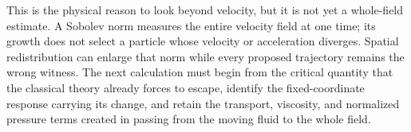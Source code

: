 This is the physical reason to look beyond velocity, but it is not yet a
whole-field estimate.  A Sobolev norm measures the entire velocity field at
one time; its growth does not select a particle whose velocity or acceleration
diverges.  Spatial redistribution can enlarge that norm while every proposed
trajectory remains the wrong witness.  The next calculation must begin from
the critical quantity that the classical theory already forces to escape,
identify the fixed-coordinate response carrying its change, and retain the
transport, viscosity, and normalized pressure terms created in passing from
the moving fluid to the whole field.
